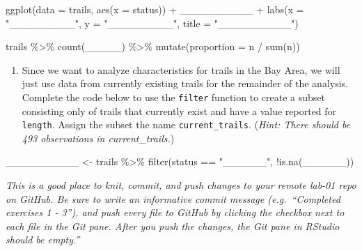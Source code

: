 \documentclass[
]{article}
\newenvironment{Shaded}{\begin{snugshade}}{\end{snugshade}}
\newcommand{\AttributeTok}[1]{\textcolor[rgb]{0.77,0.63,0.00}{#1}}
\newcommand{\FunctionTok}[1]{\textcolor[rgb]{0.00,0.00,0.00}{#1}}
\newcommand{\NormalTok}[1]{#1}
\newcommand{\OtherTok}[1]{\textcolor[rgb]{0.56,0.35,0.01}{#1}}
\newcommand{\SpecialCharTok}[1]{\textcolor[rgb]{0.00,0.00,0.00}{#1}}
\newcommand{\StringTok}[1]{\textcolor[rgb]{0.31,0.60,0.02}{#1}}
\providecommand{\tightlist}{%
  \setlength{\itemsep}{0pt}\setlength{\parskip}{0pt}}
\begin{document}
\begin{Shaded}
\begin{Highlighting}[]
\FunctionTok{ggplot}\NormalTok{(}\AttributeTok{data =}\NormalTok{ trails, }\FunctionTok{aes}\NormalTok{(}\AttributeTok{x =}\NormalTok{ status)) }\SpecialCharTok{+} 
\NormalTok{  \_\_\_\_\_\_\_\_\_\_ }\SpecialCharTok{+} 
  \FunctionTok{labs}\NormalTok{(}\AttributeTok{x =} \StringTok{"\_\_\_\_\_\_\_\_\_"}\NormalTok{, }
       \AttributeTok{y =} \StringTok{"\_\_\_\_\_\_\_\_\_"}\NormalTok{, }
       \AttributeTok{title =} \StringTok{"\_\_\_\_\_\_\_\_\_\_"}\NormalTok{)}
\end{Highlighting}
\end{Shaded}

\begin{Shaded}
\begin{Highlighting}[]
\NormalTok{trails }\SpecialCharTok{\%\textgreater{}\%}
  \FunctionTok{count}\NormalTok{(\_\_\_\_\_) }\SpecialCharTok{\%\textgreater{}\%}
  \FunctionTok{mutate}\NormalTok{(}\AttributeTok{proportion =}\NormalTok{ n }\SpecialCharTok{/} \FunctionTok{sum}\NormalTok{(n))}
\end{Highlighting}
\end{Shaded}

\begin{enumerate}
\def\labelenumi{\arabic{enumi}.}
\setcounter{enumi}{2}
\tightlist
\item
  Since we want to analyze characteristics for trails in the Bay Area,
  we will just use data from currently existing trails for the remainder
  of the analysis. Complete the code below to use the \texttt{filter}
  function to create a subset consisting only of trails that currently
  exist and have a value reported for \texttt{length}. Assign the subset
  the name \texttt{current\_trails}. (\emph{Hint: There should be 493
  observations in current\_trails.})
\end{enumerate}

\begin{Shaded}
\begin{Highlighting}[]
\NormalTok{\_\_\_\_\_\_\_\_\_\_ }\OtherTok{\textless{}{-}}\NormalTok{ trails }\SpecialCharTok{\%\textgreater{}\%}
  \FunctionTok{filter}\NormalTok{(status }\SpecialCharTok{==} \StringTok{"\_\_\_\_\_\_"}\NormalTok{, }\SpecialCharTok{!}\FunctionTok{is.na}\NormalTok{(\_\_\_\_\_\_))}
\end{Highlighting}
\end{Shaded}

\emph{This is a good place to knit, commit, and push changes to your
remote lab-01 repo on GitHub. Be sure to write an informative commit
message (e.g.~``Completed exercises 1 - 3''), and push every file to
GitHub by clicking the checkbox next to each file in the Git pane. After
you push the changes, the Git pane in RStudio should be empty.''}
\end{document}

